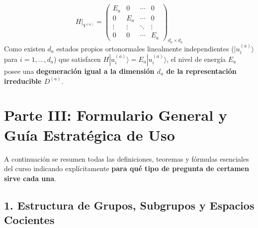 \documentclass[11pt, a4paper]{article}
\begin{document}
\begin{enumerate}
\begin{itemize}
        \[
        \left. H \right|_{V^{(a)}} = \begin{pmatrix}
        E_a & 0 & \cdots & 0 \\
        0 & E_a & \cdots & 0 \\
        \vdots & \vdots & \ddots & \vdots \\
        0 & 0 & \cdots & E_a
        \end{pmatrix}_{d_a \times d_a}
        \]
        Como existen $d_a$ estados propios ortonormales linealmente independientes ($|u_i^{(a)}\rangle$ para $i = 1, \dots, d_a$) que satisfacen $H |u_i^{(a)}\rangle = E_a |u_i^{(a)}\rangle$, el nivel de energía $E_a$ posee una \textbf{degeneración igual a la dimensión $d_a$ de la representación irreducible $D^{(a)}$}.
    \end{itemize}
\end{enumerate}

\newpage

\section*{Parte III: Formulario General y Guía Estratégica de Uso}

A continuación se resumen todas las definiciones, teoremas y fórmulas esenciales del curso indicando explícitamente \textbf{para qué tipo de pregunta de certamen sirve cada una}.

\subsection*{1. Estructura de Grupos, Subgrupos y Espacios Cocientes}
\end{document}
